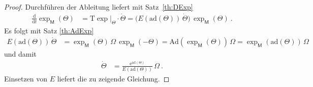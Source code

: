 \documentclass[10pt,a4paper]{article}
\theoremstyle{mytheorem}
\theoremstyle{mydefinition}
\newcommand{\dt}{\mathrm{d}}
\newcommand{\Tt}{\mathrm{T}}
\newcommand{\ad}{\mathrm{ad}}
\newcommand{\Ad}{\mathrm{Ad}}
\begin{document}
\begin{proof}
Durchführen der Ableitung liefert mit Satz~\ref{th:DExp}
\begin{align*}
	\frac{\dt}{\dt t}\exp_\mathsf{M}(\Theta)
	&= \Tt \exp|_\Theta\cdot\dot{\Theta}
	= \big(
		E(\ad(\Theta))\,\dot{\Theta}
	\big)\,\exp_\mathsf{M}(\Theta)
	\ .
\end{align*}
Es folgt mit Satz \ref{th:AdExp}
\begin{align*}
	E(\ad(\Theta))\,\dot{\Theta}
	&=
	\exp_\mathsf{M}(\Theta)\,\Omega\,\exp_\mathsf{M}(-\Theta)
	= \Ad(\exp_\mathsf{M}(\Theta))\,\Omega
	= \exp_\mathsf{M}(\ad(\Theta))\,\Omega
\end{align*}
und damit
\begin{align*}
	\dot{\Theta}
	&=
	\frac{\mathrm{e}^{\ad(\Theta)}}{E(\ad(\Theta))}
	\,\Omega
	\ .
\end{align*}
Einsetzen von $E$ liefert die zu zeigende Gleichung.
\end{proof}
\end{document}
